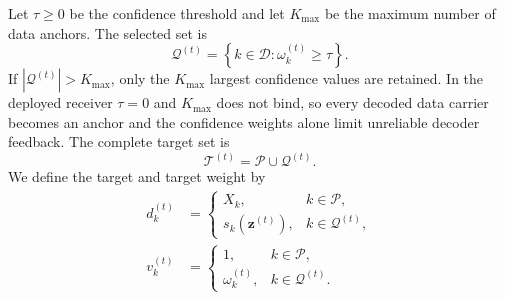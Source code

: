 \documentclass[conference]{IEEEtran}
\newcommand{\Pset}{\mathcal{P}}
\newcommand{\Dset}{\mathcal{D}}
\begin{document}
Let \(\tau\geq0\) be the confidence threshold and let \(K_{\max}\) be the
maximum number of data anchors.  The selected set is
\begin{equation}
  \mathcal Q^{(t)}
  =
  \left\{
  k\in\Dset:
  \omega_k^{(t)}\geq\tau
  \right\}.
  \label{eq:eligible}
\end{equation}
If \(|\mathcal Q^{(t)}|>K_{\max}\), only the \(K_{\max}\) largest confidence
values are retained.  In the deployed receiver \(\tau=0\) and \(K_{\max}\)
does not bind, so every decoded data carrier becomes an anchor and the
confidence weights alone limit unreliable decoder feedback.  The complete target set
is
\begin{equation}
  \mathcal T^{(t)}
  =
  \Pset\cup\mathcal Q^{(t)}.
  \label{eq:target-set}
\end{equation}
We define the target and target weight by
\begin{align}
  d_k^{(t)}
  &=
  \begin{cases}
    X_k, & k\in\Pset,\\
    s_k(\mathbf z^{(t)}), & k\in\mathcal Q^{(t)},
  \end{cases}
  \label{eq:target}\\
  v_k^{(t)}
  &=
  \begin{cases}
    1, & k\in\Pset,\\
    \omega_k^{(t)}, & k\in\mathcal Q^{(t)}.
  \end{cases}
  \label{eq:target-weight}
\end{align}
\end{document}
